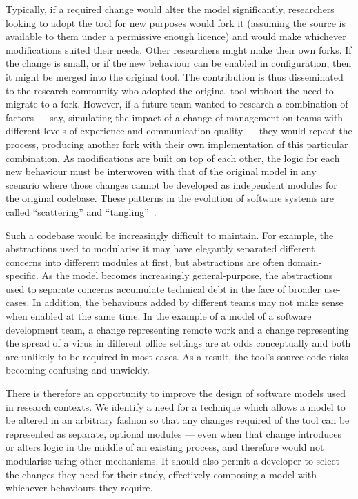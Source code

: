 Typically, if a required change would alter the model significantly, researchers
looking to adopt the tool for new purposes would fork it (assuming the source is
available to them under a permissive enough licence) and would make whichever
modifications suited their needs. Other researchers might make their own forks.
If the change is small, or if the new behaviour can be enabled in configuration,
then it might be merged into the original tool. The contribution is thus
disseminated to the research community who adopted the original tool without the
need to migrate to a fork. However, if a future team wanted to research a
combination of factors --- say, simulating the impact of a change of management
on teams with different levels of experience and communication quality --- they
would repeat the process, producing another fork with their own implementation
of this particular combination. As modifications are built on top of each other,
the logic for each new behaviour must be interwoven with that of the original
model in any scenario where those changes cannot be developed as independent
modules for the original codebase. These patterns in the evolution of software
systems are called ``scattering'' and ``tangling''~\cite{kiczales1997aspect}.

Such a codebase would be increasingly difficult to maintain. For example, the
abstractions used to modularise it may have elegantly separated different
concerns into different modules at first, but abstractions are often
domain-specific. As the model becomes increasingly general-purpose, the
abstractions used to separate concerns accumulate technical debt in the face of
broader use-cases. In addition, the behaviours added by different teams may not
make sense when enabled at the same time. In the example of a model of a
software development team, a change representing remote work and a change
representing the spread of a virus in different office settings are at odds
conceptually and both are unlikely to be required in most cases. As a result,
the tool's source code risks becoming confusing and unwieldy.

There is therefore an opportunity to improve the design of software models used
in research contexts. We identify a need for a technique which allows a model to
be altered in an arbitrary fashion so that any changes required of the tool can
be represented as separate, optional modules --- even when that change
introduces or alters logic in the middle of an existing process, and therefore
would not modularise using other mechanisms. It should also permit a developer
to select the changes they need for their study, effectively composing a model
with whichever behaviours they require.


